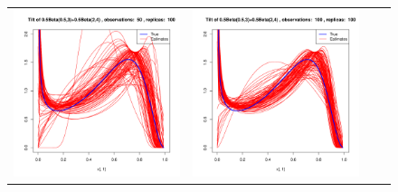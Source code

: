 \documentclass[10pt]{report}
\begin{document}
\begin{figure}[h]
\begin{tabular}{cccc}

	\includegraphics[width=\textwidth/4]{../img/p05_a05_b3_p05_a2_b4/tilted/K1/densities/n50_R100.pdf}
	&
	\includegraphics[width=\textwidth/4]{../img/p05_a05_b3_p05_a2_b4/tilted/K1/densities/n100_R100.pdf}

\end{tabular}
\end{figure}
\end{document}
